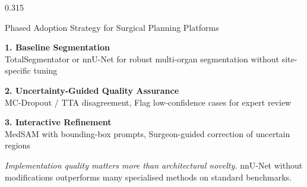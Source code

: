 \documentclass[final,t]{beamer}
\begin{document}
\begin{frame}[t]
\begin{columns}[t,totalwidth=\textwidth]
\begin{column}{0.315\textwidth}
\begin{pblock}{Phased Adoption Strategy for \newline Surgical Planning Platforms}
\begin{tcolorbox}[colback=utadnavy!10,colframe=utadnavy,arc=4pt,boxrule=1.2pt,
  top=4pt,bottom=4pt,left=7pt,right=7pt,before={\vskip0pt},after={\vskip0pt}]
  {\normalsize\bfseries\color{utadnavy!80!black} 1. Baseline Segmentation}\\[2pt]
  {\small TotalSegmentator or nnU-Net for robust multi-organ segmentation
  without site-specific tuning}
\end{tcolorbox}
\begin{tcolorbox}[colback=utadnavy!10,colframe=utadnavy,arc=4pt,boxrule=1.2pt,
  top=4pt,bottom=4pt,left=7pt,right=7pt,before={\vskip0pt},after={\vskip0pt}]
  {\normalsize\bfseries\color{utadnavy!80!black} 2. Uncertainty-Guided Quality Assurance}\\[2pt]
  {\small MC-Dropout / TTA disagreement, Flag low-confidence cases for
  expert review}
\end{tcolorbox}
\begin{tcolorbox}[colback=utadnavy!10,colframe=utadnavy,arc=4pt,boxrule=1.2pt,
  top=4pt,bottom=4pt,left=7pt,right=7pt,before={\vskip0pt},after={\vskip0pt}]
  {\normalsize\bfseries\color{utadnavy!80!black} 3. Interactive Refinement}\\[2pt]
  {\small MedSAM with bounding-box prompts, Surgeon-guided correction of
  uncertain regions}
\end{tcolorbox}

\vspace{0.4em}
\begin{notebox}[utadnavy]
  {\small
    \emph{Implementation quality matters more than
    architectural novelty.} nnU-Net without modifications outperforms many
    specialised methods on standard benchmarks.
  }
\end{notebox}
\end{pblock}


\end{column}
\end{columns}
\end{frame}
\end{document}
